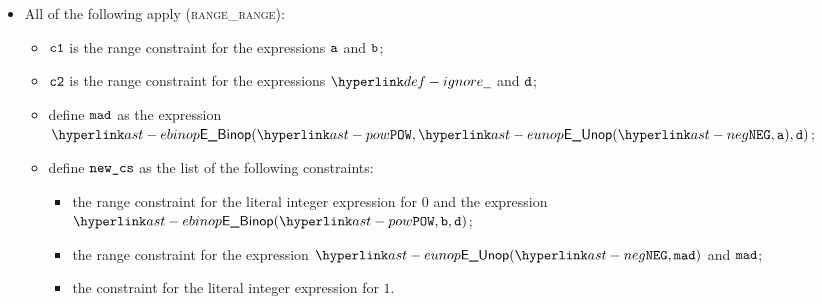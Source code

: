 \begin{itemize}
  \item All of the following apply (\textsc{range\_range}):
  \begin{itemize}
    \item $\vcone$ is the range constraint for the expressions $\va$ and $\vb$;
    \item $\vctwo$ is the range constraint for the expressions $\Ignore$ and $\vd$;
    \item define $\vmad$ as the expression $\EBinop(\POW, \EUnop(\NEG, \va), \vd)$;
    \item define $\newcs$ as the list of the following constraints:
    \begin{itemize}
      \item the range constraint for the literal integer expression for $0$ and the expression
            $\EBinop(\POW, \vb, \vd)$;
      \item the range constraint for the expression $\EUnop(\NEG, \vmad)$ and $\vmad$;
      \item the constraint for the literal integer expression for $1$.
    \end{itemize}
  \end{itemize}
\end{itemize}

\FormallyParagraph
\begin{mathpar}
\end{mathpar}

\begin{mathpar}
\end{mathpar}

\begin{mathpar}
\end{mathpar}

